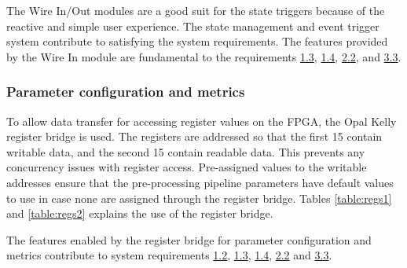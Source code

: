 \documentclass[12pt]{report}
\begin{document}
The Wire In/Out modules are a good suit for the state triggers because of the reactive and simple user experience.
The state management and event trigger system contribute to satisfying the system requirements. The features provided by the Wire In module are fundamental to the requirements \hyperref[req1.3]{1.3}, \hyperref[req1.4]{1.4}, \hyperref[req2.2]{2.2}, and \hyperref[req3.3]{3.3}.

\subsubsection{Parameter configuration and metrics}
To allow data transfer for accessing register values on the FPGA, the Opal Kelly register bridge is used. The registers are addressed so that the first 15 contain writable data, and the second 15 contain readable data. This prevents any concurrency issues with register access. Pre-assigned values to the writable addresses ensure that the pre-processing pipeline parameters have default values to use in case none are assigned through the register bridge. Tables \ref{table:regs1} and \ref{table:regs2} explains the use of the register bridge. 
\par
The features enabled by the register bridge for parameter configuration and metrics contribute to system requirements \hyperref[req1.2]{1.2}, \hyperref[req1.3]{1.3}, \hyperref[req1.4]{1.4}, \hyperref[req2.2]{2.2} and \hyperref[req3.3]{3.3}.
\end{document}
